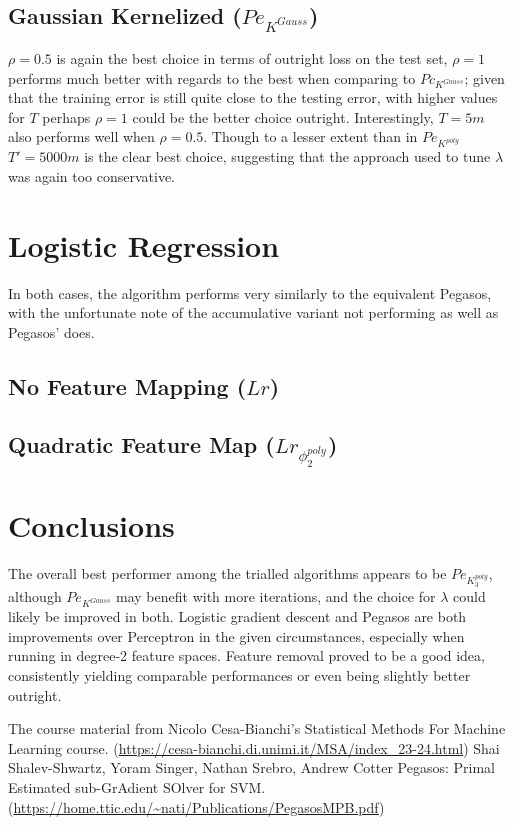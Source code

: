 

\pagebreak{}
\subsection{Gaussian Kernelized ($Pe_{K^{Gauss}}$)}
$\rho{} = 0.5$ is again the best choice in terms of outright loss on the test set, $\rho{} = 1$ performs much better with regards to the best when comparing to $Pc_{K^{Gauss}}$; given that the training error is still quite close to the testing error, with higher values for $T$ perhaps $\rho{} = 1$ could be the better choice outright. Interestingly, $T = 5m$ also performs well when $\rho{} = 0.5$. Though to a lesser extent than in $Pe_{K^{poly}}$ $T' = 5000m$ is the clear best choice, suggesting that the approach used to tune $\lambda{}$ was again too conservative.



\pagebreak{}

\section{Logistic Regression}
In both cases, the algorithm performs very similarly to the equivalent Pegasos, with the unfortunate note of the accumulative variant not performing as well as Pegasos' does.

\subsection{No Feature Mapping ($Lr$)}


\subsection{Quadratic Feature Map ($Lr_{\phi^{poly}_2}$)}


\section{Conclusions}
The overall best performer among the trialled algorithms appears to be $Pe_{K^{poly}_3}$, although $Pe_{K^{Gauss}}$ may benefit with more iterations, and the choice for $\lambda{}$ could likely be improved in both. Logistic gradient descent and Pegasos are both improvements over Perceptron in the given circumstances, especially when running in degree-2 feature spaces. Feature removal proved to be a good idea, consistently yielding comparable performances or even being slightly better outright.

\pagebreak{}
\begin{thebibliography}{9}
The course material from Nicolo Cesa-Bianchi's Statistical Methods For Machine Learning course. (\url{https://cesa-bianchi.di.unimi.it/MSA/index_23-24.html})
Shai Shalev-Shwartz, Yoram Singer, Nathan Srebro, Andrew Cotter Pegasos: Primal Estimated
sub-GrAdient SOlver for SVM. (\url{https://home.ttic.edu/~nati/Publications/PegasosMPB.pdf})

\end{thebibliography}


